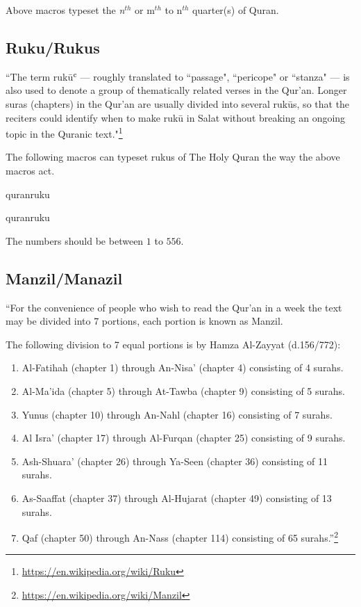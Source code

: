 \documentclass{ltxdoc}
\begin{document}
Above macros typeset the \textit{n}$^{th}$ or m$^{th}$ to n$^{th}$ quarter(s) of Quran.   

\subsection{Ruku/Rukus}
``The term ruk\= uʿ --- roughly translated to ``passage", ``pericope" or ``stanza" --- is also used to denote a group of thematically related verses in the Qur'an. Longer suras (chapters) in the Qur'an are usually divided into several ruk\= us, so that the reciters could identify when to make ruk\= u in Salat without breaking an ongoing topic in the Quranic text."\footnote{\url{https://en.wikipedia.org/wiki/Ruku}}

The following macros can typeset rukus of The Holy Quran the way the above macros act. 

\begin{declcs}{quranruku}
\end{declcs}
\begin{declcs}{quranruku}
\end{declcs}
The numbers should be between $1$ to $556$.

\subsection{Manzil/Manazil}
``For the convenience of people who wish to read the Qur'an in a week the text may be divided into 7 portions, each portion is known as Manzil.

The following division to 7 equal portions is by Hamza Al-Zayyat (d.156/772):
\begin{enumerate}
    \item Al-Fatihah (chapter 1) through An-Nisa' (chapter 4) consisting of 4 surahs.
    \item Al-Ma'ida (chapter 5) through At-Tawba (chapter 9) consisting of 5 surahs.
    \item Yunus (chapter 10) through An-Nahl (chapter 16) consisting of 7 surahs.
    \item Al Isra' (chapter 17) through Al-Furqan (chapter 25) consisting of 9 surahs.
    \item Ash-Shuara' (chapter 26) through Ya-Seen (chapter 36) consisting of 11 surahs.
    \item As-Saaffat (chapter 37) through Al-Hujarat (chapter 49) consisting of 13 surahs.
    \item Qaf (chapter 50) through An-Nass (chapter 114) consisting of 65 surahs.''\footnote{\url{https://en.wikipedia.org/wiki/Manzil}}
\end{enumerate}
\end{document}
